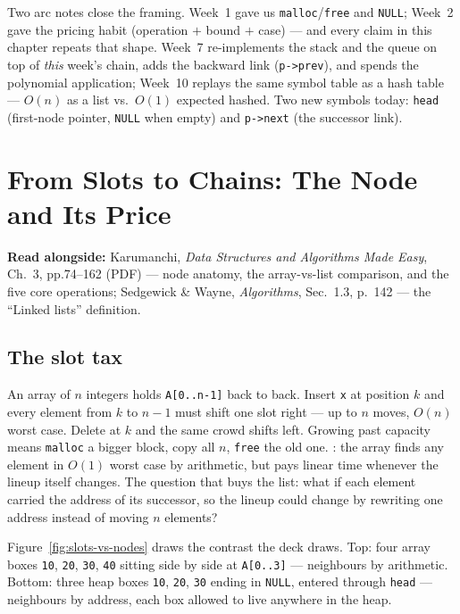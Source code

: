 \documentclass[11pt]{article}
\begin{document}
Two arc notes close the framing. Week~1 gave us \texttt{malloc}/\texttt{free} and \texttt{NULL}; Week~2 gave the pricing habit (operation $+$ bound $+$ case) --- and every claim in this chapter repeats that shape. Week~7 re-implements the stack and the queue on top of \emph{this} week's chain, adds the backward link (\texttt{p->prev}), and spends the polynomial application; Week~10 replays the same symbol table as a hash table --- $O(n)$ as a list vs.\ $O(1)$ expected hashed. Two new symbols today: \texttt{head} (first-node pointer, \texttt{NULL} when empty) and \texttt{p->next} (the successor link). 

\section{From Slots to Chains: The Node and Its Price}

\textbf{Read alongside:} Karumanchi, \textit{Data Structures and Algorithms Made Easy}, Ch.~3, pp.74--162 (PDF) --- node anatomy, the array-vs-list comparison, and the five core operations; Sedgewick \& Wayne, \textit{Algorithms}, Sec.~1.3, p.~142 --- the ``Linked lists'' definition.

\subsection{The slot tax}

An array of $n$ integers holds \texttt{A[0..n-1]} back to back. Insert \texttt{x} at position $k$ and every element from $k$ to $n-1$ must shift one slot right --- up to $n$ moves, $O(n)$ worst case. Delete at $k$ and the same crowd shifts left. Growing past capacity means \texttt{malloc} a bigger block, copy all $n$, \texttt{free} the old one. : the array finds any element in $O(1)$ worst case by arithmetic, but pays linear time whenever the lineup itself changes. The question that buys the list: what if each element carried the address of its successor, so the lineup could change by rewriting one address instead of moving $n$ elements?

Figure~\ref{fig:slots-vs-nodes} draws the contrast the deck draws. Top: four array boxes \texttt{10}, \texttt{20}, \texttt{30}, \texttt{40} sitting side by side at \texttt{A[0..3]} --- neighbours by arithmetic. Bottom: three heap boxes \texttt{10}, \texttt{20}, \texttt{30} ending in \texttt{NULL}, entered through \texttt{head} --- neighbours by address, each box allowed to live anywhere in the heap.
\end{document}
